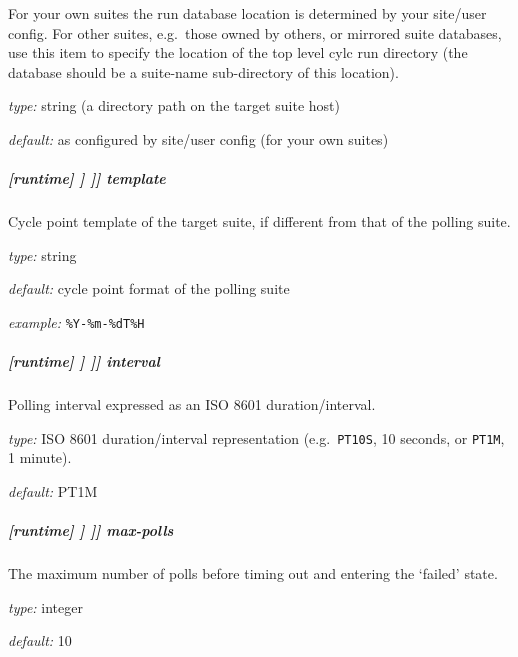 For your own suites the run database location is determined by your
site/user config. For other suites, e.g.\  those owned by others, or
mirrored suite databases, use this item to specify the location
of the top level cylc run directory (the database should be a
suite-name sub-directory of this location).

\begin{myitemize}
    \item {\em type:} string (a directory path on the target suite host)
    \item {\em default:} as configured by site/user config (for your own suites)
\end{myitemize}

\subparagraph[template]{[runtime] \textrightarrow [[\_\_NAME\_\_]] \textrightarrow [[[suite state polling]]] \textrightarrow template}

Cycle point template of the target suite, if different from that of the polling suite.

\begin{myitemize}
    \item {\em type:} string
    \item {\em default:} cycle point format of the polling suite
    \item {\em example:} \lstinline=%Y-%m-%dT%H=
\end{myitemize}

\subparagraph[interval]{[runtime] \textrightarrow [[\_\_NAME\_\_]] \textrightarrow [[[suite state polling]]] \textrightarrow interval}

Polling interval expressed as an ISO 8601 duration/interval.
\begin{myitemize}
    \item {\em type:} ISO 8601 duration/interval representation (e.g.\ 
 \lstinline=PT10S=, 10 seconds, or \lstinline=PT1M=, 1 minute).
    \item {\em default:} PT1M
\end{myitemize}

\subparagraph[max-polls]{[runtime] \textrightarrow [[\_\_NAME\_\_]] \textrightarrow [[[suite state polling]]] \textrightarrow max-polls}

The maximum number of polls before timing out and entering the `failed' state.

\begin{myitemize}
    \item {\em type:} integer
    \item {\em default:} 10
\end{myitemize}

